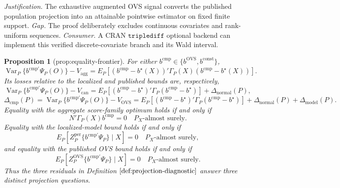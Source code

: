 \documentclass{article}
\newtheorem{proposition}{Proposition}
\begin{document}
\par\smallskip\noindent \textit{Justification.} The exhaustive augmented OVS signal converts the published population projection into an attainable pointwise estimator on fixed finite support. \textit{Gap.} The proof deliberately excludes continuous covariates and rank-uniform sequences. \textit{Consumer.} A CRAN \(\texttt{triplediff}\) optional backend can implement this verified discrete-covariate branch and its Wald interval.

\begin{proposition}[prop:equality-frontier]\label{prop:equality-frontier}
For either \(b^{\mathrm{cmp}}\in\{b^{\mathrm{OVS}},b^{\mathrm{const}}\}\),
\[
\operatorname{Var}_P\{b^{\mathrm{cmp}\prime}\Psi_P(O)\}-V_{\mathrm{agg}}
=E_P[(b^{\mathrm{cmp}}-b^\star(X))'\Gamma_P(X)(b^{\mathrm{cmp}}-b^\star(X))].
\tag{E1}
\]
Its losses relative to the localized and published bounds are, respectively,
\[
\operatorname{Var}_P\{b^{\mathrm{cmp}\prime}\Psi_P(O)\}-V_{\mathrm{can}}
=E_P[(b^{\mathrm{cmp}}-b^\star)'\Gamma_P(b^{\mathrm{cmp}}-b^\star)]
+\Delta_{\mathrm{normal}}(P),
\tag{E2}
\]
\[
\Delta_{\mathrm{cmp}}(P)
=\operatorname{Var}_P\{b^{\mathrm{cmp}\prime}\Psi_P(O)\}-V_{\mathrm{OVS}}
=E_P[(b^{\mathrm{cmp}}-b^\star)'\Gamma_P(b^{\mathrm{cmp}}-b^\star)]
+\Delta_{\mathrm{normal}}(P)+\Delta_{\mathrm{model}}(P).
\tag{E3}
\]
Equality with the aggregate score-family optimum holds if and only if
\[
N'\Gamma_P(X)b^{\mathrm{cmp}}=0
\quad P_X\text{-almost surely}.
\tag{E4}
\]
Equality with the localized-model bound holds if and only if
\[
E_P[Z_P^{\mathrm{per}}\{b^{\mathrm{cmp}\prime}\Psi_P\}\mid X]=0
\quad P_X\text{-almost surely},
\tag{E5}
\]
and equality with the published OVS bound holds if and only if
\[
E_P[Z_P^{\mathrm{OVS}}\{b^{\mathrm{cmp}\prime}\Psi_P\}\mid X]=0
\quad P_X\text{-almost surely}.
\tag{E6}
\]
Thus the three residuals in Definition \(\ref{def:projection-diagnostic}\) answer three distinct projection questions.
\end{proposition}
\end{document}
